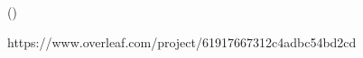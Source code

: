 


\maketitle

\section{}

\section{}

\section{}

(\cite{neufeld2013reviews})

\printbibliography[heading=bibintoc] %
https://www.overleaf.com/project/61917667312c4adbc54bd2cd

